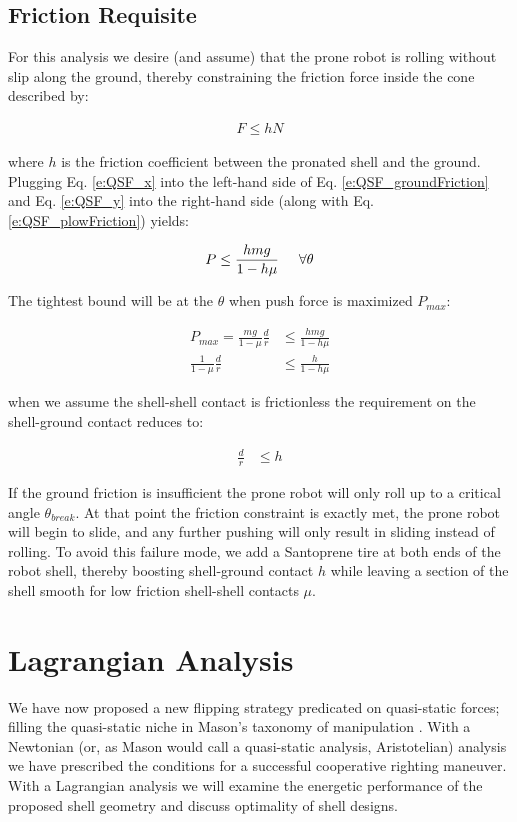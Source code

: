 \documentclass[letterpaper]{report}
\begin{document}
\subsection{Friction Requisite}
For this analysis we desire (and assume) that the prone robot is rolling without slip along the ground, thereby constraining the friction force inside the cone described by:

\begin{align}
  F \leq h N \label{e:QSF_groundFriction}
\end{align}

where $h$ is the friction coefficient between the pronated shell and the ground.
Plugging Eq. \ref{e:QSF_x} into the left-hand side of Eq. \ref{e:QSF_groundFriction} and Eq. \ref{e:QSF_y} into the right-hand side (along with Eq. \ref{e:QSF_plowFriction}) yields:

\begin{align}
  P \leq \frac{hmg}{1-h\mu} \label{e:QSF_pushConstraint1} \hspace{5mm} \forall \theta
\end{align}

The tightest bound will be at the $\theta$ when push force is maximized $P_{max}$:

\begin{align}
  P_{max} = \frac{mg}{1-\mu} \frac{d}{r} &\leq \frac{hmg}{1-h\mu} \\
  \frac{1}{1-\mu} \frac{d}{r} &\leq \frac{h}{1-h\mu}
  \label{e:gndFrictionReq}
\end{align}

when we assume the shell-shell contact is frictionless the requirement on the shell-ground contact reduces to:

\begin{align}
  \frac{d}{r} &\leq h
\end{align}

If the ground friction is insufficient the prone robot will only roll up to a critical angle $\theta_{break}$.
At that point the friction constraint is exactly met, the prone robot will begin to slide, and any further pushing will only result in sliding instead of rolling.
To avoid this failure mode, we add a Santoprene tire at both ends of the robot shell, thereby boosting shell-ground contact $h$ while leaving a section of the shell smooth for low friction shell-shell contacts $\mu$.

\section{Lagrangian Analysis \label{sec:QS_HamAnalysis}}
We have now proposed a new flipping strategy predicated on quasi-static forces; filling the quasi-static niche in Mason's taxonomy of manipulation \cite{MasonMORMBook}.
With a Newtonian (or, as Mason would call a quasi-static analysis, Aristotelian) analysis we have prescribed the conditions for a successful cooperative righting maneuver.
With a Lagrangian analysis we will examine the energetic performance of the proposed shell geometry and discuss optimality of shell designs.
\end{document}
